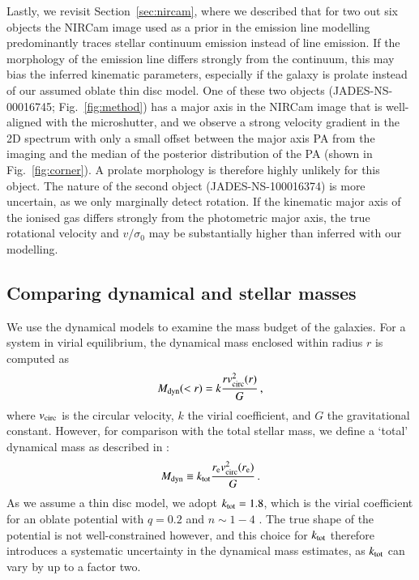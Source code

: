 \documentclass[longauth]{aa}
\newcommand{\re}{r_{\rm e}}
\newcommand{\vc}{v_{\rm circ}}
\newcommand{\vdisp}{\sigma_0}
\newcommand{\Mdyn}{M_{\rm dyn}}
\begin{document}
{Lastly, we revisit Section~\ref{sec:nircam}, where we described that for two out six objects the NIRCam image used as a prior in the emission line modelling predominantly traces stellar continuum emission instead of line emission. If the morphology of the emission line differs strongly from the continuum, this may bias the inferred kinematic parameters, especially if the galaxy is prolate instead of our assumed oblate thin disc model. One of these two objects (JADES-NS-00016745; Fig.~\ref{fig:method}) has a major axis in the NIRCam image that is well-aligned with the microshutter, and we observe a strong velocity gradient in the 2D spectrum with only a small offset between the major axis PA from the imaging and the median of the posterior distribution of the PA (shown in Fig.~\ref{fig:corner}). A prolate morphology is therefore highly unlikely for this object. The nature of the second object (JADES-NS-100016374) is more uncertain, as we only marginally detect rotation. If the kinematic major axis of the ionised gas differs strongly from the photometric major axis, the true rotational velocity and $v/\vdisp$ may be substantially higher than inferred with our modelling. }




\subsection{Comparing dynamical and stellar masses}\label{sec:mdyn}






We use the dynamical models to examine the mass budget of the galaxies. For a system in virial equilibrium, the dynamical mass enclosed within radius $r$ is computed as
\begin{equation}
    \Mdyn(<r) = k \frac{r \vc^2(r)}{G}\,,
\end{equation}
where $\vc$ is the circular velocity, $k$ the virial coefficient, and $G$ the gravitational constant. However, for comparison with the total stellar mass, we define a `total' dynamical mass as described in \citet{Price2022}:
\begin{equation}
    \Mdyn \equiv k_{\rm tot} \frac{\re \vc^2(\re) }{G}\,.
    \label{eq:mdyn}
\end{equation}
As we assume a thin disc model, we adopt $k_{\rm tot}=1.8$, which is the virial coefficient for an oblate potential with $q=0.2$ and $n\sim1-4$ \citep[][Fig. 4]{Price2022}. The true shape of the potential is not well-constrained however, and this choice for $k_{\rm tot}$ therefore introduces a systematic uncertainty in the dynamical mass estimates, as $k_{\rm tot}$ can vary by up to a factor two.
\end{document}
